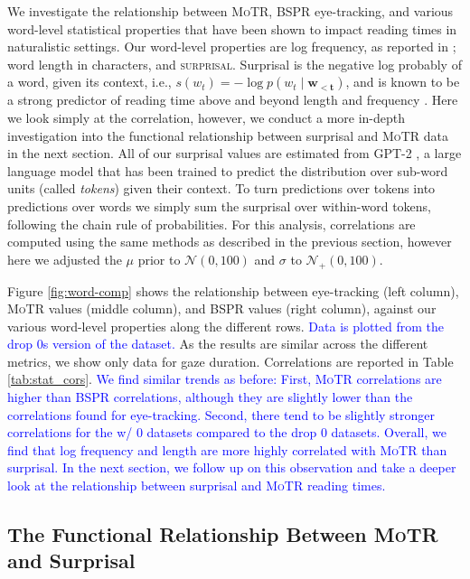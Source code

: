 \documentclass[12pt]{article}
\newcommand{\motr}{\textsc{MoTR}\xspace}
\newcommand{\defn}[1]{\textsc{#1}}
\newcommand{\word}[1]{\textit{#1}}
\newcommand{\change}[1]{\textcolor{blue}{#1}}
\begin{document}
{We investigate the relationship between \motr, BSPR eye-tracking, and various word-level statistical properties that have been shown to impact reading times in naturalistic settings. Our word-level properties are log frequency, as reported in \citet{speer2022wordfreq}; word length in characters, and \defn{surprisal}. Surprisal is the negative log probably of a word, given its context, i.e., $s(w_t) = - \log p(w_t \mid \mathbf{w_{<t}})$, and is known to be a strong predictor of reading time above and beyond length and frequency \citep{hale2001probabilistic, levy2008expectation, smith2013effect, wilcox2020predictive, wilcox2023testing}. Here we look simply at the correlation, however, we conduct a more in-depth investigation into the functional relationship between surprisal and \motr data in the next section. All of our surprisal values are estimated from GPT-2 \citep{radford2019language}, a large language model that has been trained to predict the distribution over sub-word units (called \word{tokens}) given their context. To turn predictions over tokens into predictions over words we simply sum the surprisal over within-word tokens, following the chain rule of probabilities. For this analysis, correlations are computed using the same methods as described in the previous section, however here we adjusted the \(\mu\) prior to \(\mathcal{N}(0, 100)\) and \(\sigma\) to \(\mathcal{N}_{+}(0, 100)\). 

Figure \ref{fig:word-comp} shows the relationship between eye-tracking (left column), \motr values (middle column), and BSPR values (right column), against our various word-level properties along the different rows. \change{Data is plotted from the drop $0$s version of the dataset.} As the results are similar across the different metrics, we show only data for gaze duration. Correlations are reported in Table \ref{tab:stat_cors}. \change{We find similar trends as before: First, \motr correlations are higher than BSPR correlations, although they are slightly lower than the correlations found for eye-tracking. Second, there tend to be slightly stronger correlations for the w/ 0 datasets compared to the drop 0 datasets. Overall, we find that log frequency and length are more highly correlated with \motr than surprisal. In the next section, we follow up on this observation and take a deeper look at the relationship between surprisal and \motr reading times. }


\subsection{The Functional Relationship Between \motr and Surprisal} \label{sec:info-theory}

}
\end{document}
